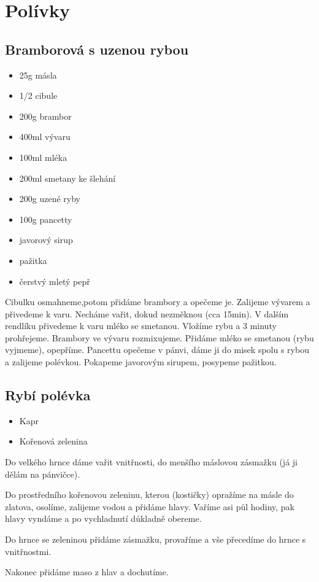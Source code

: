 \documentclass[10pt,a4paper]{article}
\newenvironment{myitemize}
{ \begin{itemize}
    \setlength{\itemsep}{0pt}
    \setlength{\parskip}{0pt}
    \setlength{\parsep}{0pt}     }
{ \end{itemize}                  }
\begin{document}
\section{Polívky}
\subsection{Bramborová s uzenou rybou}
\begin{minipage}[t]{0,5\textwidth}
\begin{myitemize} 
\item 25g másla
\item 1/2 cibule
\item 200g brambor
\item 400ml vývaru
\item 100ml mléka
\item 200ml smetany ke šlehání
\item 200g uzené ryby
\item 100g pancetty
\item javorový sirup
\item pažitka
\item čerstvý mletý pepř
\end{myitemize}
\end{minipage}
\begin{minipage}[t]{0,5\textwidth}
Cibulku osmahneme,potom přidáme brambory a opečeme je. Zalijeme vývarem a přivedeme k varu. Necháme vařit, dokud nezměknou (cca 15min). V dalším rendlíku přivedeme k varu mléko se smetanou. Vložíme rybu a 3 minuty prohřejeme. Brambory ve vývaru rozmixujeme. Přidáme mléko se smetanou (rybu vyjmeme), opepříme. Pancettu opečeme v pánvi, dáme ji do misek spolu s rybou a zalijeme polévkou. Pokapeme javorovým sirupem, posypeme pažitkou.
\end{minipage}

\subsection{Rybí polévka}
\begin{minipage}[t]{0,5\textwidth}
\begin{myitemize} 
\item Kapr
\item Kořenová zelenina
\end{myitemize}
\end{minipage}
\begin{minipage}[t]{0,5\textwidth}
Do velkého hrnce dáme vařit vnitřnosti, do menšího máslovou zásmažku (já ji dělám na pánvičce).

Do prostředního kořenovou zeleninu, kterou (kostičky) opražíme na másle do zlatova, osolíme, zalijeme vodou a přidáme hlavy. Vaříme asi půl hodiny, pak hlavy vyndáme a po vychladnutí důkladně obereme. 

Do hrnce se zeleninou přidáme zásmažku, provaříme a vše přecedíme do hrnce s vnitřnostmi. 

Nakonec přidáme maso z hlav a dochutíme. 
\end{minipage}
\end{document}
